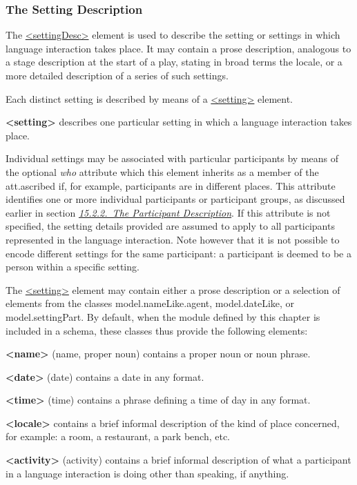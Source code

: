 \subsubsection[{The Setting Description}]{The Setting Description}\label{CCAHSE}\par
The \hyperref[TEI.settingDesc]{<settingDesc>} element is used to describe the setting or settings in which language interaction takes place. It may contain a prose description, analogous to a stage description at the start of a play, stating in broad terms the locale, or a more detailed description of a series of such settings.\par
Each distinct setting is described by means of a \hyperref[TEI.setting]{<setting>} element. 
\begin{sansreflist}
  
\item [\textbf{<setting>}] describes one particular setting in which a language interaction takes place.
\end{sansreflist}
 Individual settings may be associated with particular participants by means of the optional {\itshape who} attribute which this element inherits as a member of the \textsf{att.ascribed} if, for example, participants are in different places. This attribute identifies one or more individual participants or participant groups, as discussed earlier in section \textit{\hyperref[CCAHPA]{15.2.2.\ The Participant Description}}. If this attribute is not specified, the setting details provided are assumed to apply to all participants represented in the language interaction. Note however that it is not possible to encode different settings for the same participant: a participant is deemed to be a person within a specific setting.\par
The \hyperref[TEI.setting]{<setting>} element may contain either a prose description or a selection of elements from the classes \textsf{model.nameLike.agent}, \textsf{model.dateLike}, or \textsf{model.settingPart}. By default, when the module defined by this chapter is included in a schema, these classes thus provide the following elements: 
\begin{sansreflist}
  
\item [\textbf{<name>}] (name, proper noun) contains a proper noun or noun phrase.
\item [\textbf{<date>}] (date) contains a date in any format.
\item [\textbf{<time>}] (time) contains a phrase defining a time of day in any format.
\item [\textbf{<locale>}] contains a brief informal description of the kind of place concerned, for example: a room, a restaurant, a park bench, etc.
\item [\textbf{<activity>}] (activity) contains a brief informal description of what a participant in a language interaction is doing other than speaking, if anything.
\end{sansreflist}
